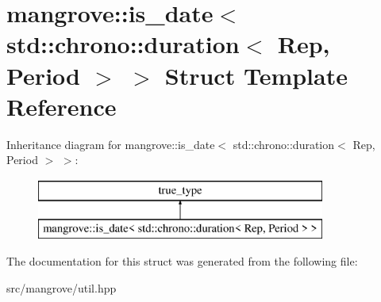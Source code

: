 \hypertarget{structmangrove_1_1is__date_3_01std_1_1chrono_1_1duration_3_01Rep_00_01Period_01_4_01_4}{}\section{mangrove\+:\+:is\+\_\+date$<$ std\+:\+:chrono\+:\+:duration$<$ Rep, Period $>$ $>$ Struct Template Reference}
\label{structmangrove_1_1is__date_3_01std_1_1chrono_1_1duration_3_01Rep_00_01Period_01_4_01_4}
Inheritance diagram for mangrove\+:\+:is\+\_\+date$<$ std\+:\+:chrono\+:\+:duration$<$ Rep, Period $>$ $>$\+:\begin{figure}[H]
\begin{center}
\leavevmode
\includegraphics[height=2.000000cm]{structmangrove_1_1is__date_3_01std_1_1chrono_1_1duration_3_01Rep_00_01Period_01_4_01_4}
\end{center}
\end{figure}


The documentation for this struct was generated from the following file\+:\begin{DoxyCompactItemize}
\item 
src/mangrove/util.\+hpp\end{DoxyCompactItemize}
